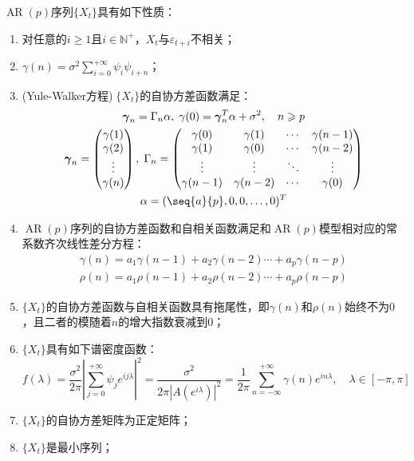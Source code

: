 \begin{property}\label{prop:ARp}
	$\operatorname{AR}(p)$序列$\{X_t\}$具有如下性质：
	\begin{enumerate}
		\item 对任意的$i\geqslant1$且$i\in\mathbb{N}^+$，$X_t$与$\varepsilon_{t+i}$不相关；
		\item $\gamma(n)=\sigma^2\sum\limits_{i=0}^{+\infty}\psi_i\psi_{i+n}$；
		\item (Yule-Walker方程)$\;\{X_t\}$的自协方差函数满足：
		\begin{gather*}
			\boldsymbol{\gamma}_n=\Gamma_n\alpha,\;
			\gamma(0)=\boldsymbol{\gamma}_n^T\alpha+\sigma^2,\quad n\geqslant p \\
			\boldsymbol{\gamma}_n=
			\begin{pmatrix}
				\gamma(1) \\
				\gamma(2) \\
				\vdots \\
				\gamma(n)
			\end{pmatrix},\;
			\Gamma_n=
			\begin{pmatrix}
				\gamma(0) & \gamma(1) & \cdots & \gamma(n-1) \\
				\gamma(1) & \gamma(0) & \cdots & \gamma(n-2) \\
				\vdots & \vdots & \ddots & \vdots \\
				\gamma(n-1) & \gamma(n-2) & \cdots & \gamma(0) \\
			\end{pmatrix} \\
			\alpha=(\seq{a}{p},0,0,\dots,0)^T
		\end{gather*}
		\item $\operatorname{AR}(p)$序列的自协方差函数和自相关函数满足和$\operatorname{AR}(p)$模型相对应的常系数齐次线性差分方程：
		\begin{gather*}
			\gamma(n)=a_1\gamma(n-1)+a_2\gamma(n-2)\cdots+a_p\gamma(n-p) \\
			\rho(n)=a_1\rho(n-1)+a_2\rho(n-2)\cdots+a_p\rho(n-p)
		\end{gather*}
		\item $\{X_t\}$的自协方差函数与自相关函数具有拖尾性，即$\gamma(n)$和$\rho(n)$始终不为$0$，且二者的模随着$n$的增大指数衰减到$0$；
		\item $\{X_t\}$具有如下谱密度函数：
		\begin{equation*}
			f(\lambda)=\frac{\sigma^2}{2\pi}\left|\sum_{j=0}^{+\infty}\psi_je^{ij\lambda}\right|^2=\frac{\sigma^2}{2\pi|A(e^{i\lambda})|^2}=\frac{1}{2\pi}\sum_{n=-\infty}^{+\infty}\gamma(n)e^{in\lambda},\quad\lambda\in[-\pi,\pi]
		\end{equation*}
		\item $\{X_t\}$的自协方差矩阵为正定矩阵；
		\item $\{X_t\}$是最小序列；
	\end{enumerate}
\end{property}
